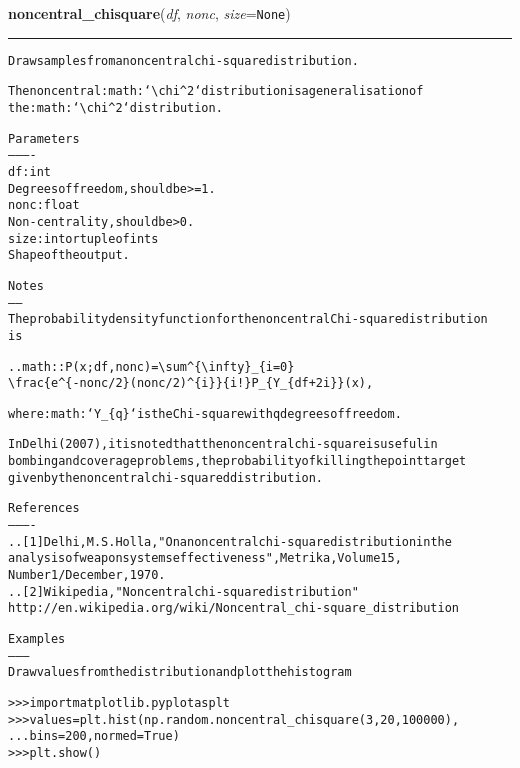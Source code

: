 \hspace{.8\funcindent}\begin{boxedminipage}{\funcwidth}

    \raggedright \textbf{noncentral\_chisquare}(\textit{df}, \textit{nonc}, \textit{size}={\tt None})

    \vspace{-1.5ex}

    \rule{\textwidth}{0.5\fboxrule}
\setlength{\parskip}{2ex}
\begin{alltt}
Draw samples from a noncentral chi-square distribution.

The noncentral :math:`{\textbackslash}chi{\textasciicircum}2` distribution is a generalisation of
the :math:`{\textbackslash}chi{\textasciicircum}2` distribution.

Parameters
----------
df : int
    Degrees of freedom, should be {\textgreater}= 1.
nonc : float
    Non-centrality, should be {\textgreater} 0.
size : int or tuple of ints
    Shape of the output.

Notes
-----
The probability density function for the noncentral Chi-square distribution
is

.. math:: P(x;df,nonc) = {\textbackslash}sum{\textasciicircum}\{{\textbackslash}infty\}\_\{i=0\}
                       {\textbackslash}frac\{e{\textasciicircum}\{-nonc/2\}(nonc/2){\textasciicircum}\{i\}\}\{i!\}P\_\{Y\_\{df+2i\}\}(x),

where :math:`Y\_\{q\}` is the Chi-square with q degrees of freedom.

In Delhi (2007), it is noted that the noncentral chi-square is useful in
bombing and coverage problems, the probability of killing the point target
given by the noncentral chi-squared distribution.

References
----------
.. [1] Delhi, M.S. Holla, "On a noncentral chi-square distribution in the
       analysis of weapon systems effectiveness", Metrika, Volume 15,
       Number 1 / December, 1970.
.. [2] Wikipedia, "Noncentral chi-square distribution"
       http://en.wikipedia.org/wiki/Noncentral\_chi-square\_distribution

Examples
--------
Draw values from the distribution and plot the histogram

{\textgreater}{\textgreater}{\textgreater} import matplotlib.pyplot as plt
{\textgreater}{\textgreater}{\textgreater} values = plt.hist(np.random.noncentral\_chisquare(3, 20, 100000),
...                   bins=200, normed=True)
{\textgreater}{\textgreater}{\textgreater} plt.show()


\end{alltt}
\end{boxedminipage}
